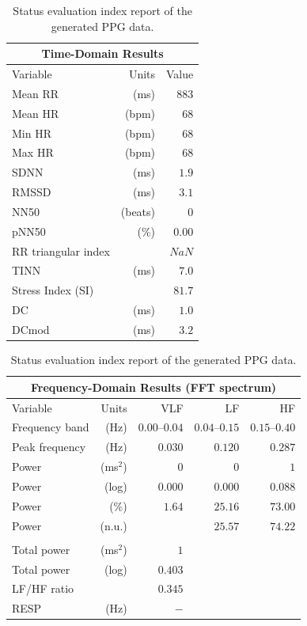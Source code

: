 \documentclass[sigchi,authordraft]{acmart}
\begin{document}
\begin{table}[!t]
  \small
  \centering
  \caption{Status evaluation index report of the generated PPG data.}
  \begin{tabular}{lrr}
  \multicolumn{3}{c}{Time-Domain Results} \\
  \toprule
    Variable & Units & Value \\
    \midrule
    Mean RR & (ms) & $883$ \\
    Mean HR & (bpm) & $68$ \\
    Min HR & (bpm) & $68$ \\
    Max HR & (bpm) & $68$ \\
    SDNN & (ms) & $1.9$ \\
    RMSSD & (ms) & $3.1$ \\
    NN50 & (beats) & $0$ \\
    pNN50 & (\%) & $0.00$ \\
    RR triangular index & & $NaN$ \\
    TINN & (ms) & $7.0$ \\
    Stress Index (SI) & & $81.7$ \\
    DC & (ms) & $1.0$ \\
    DCmod & (ms) & $3.2$ \\
    \bottomrule
  \end{tabular}
  \begin{tabular}{lrrrr}
  \multicolumn{5}{c}{Frequency-Domain Results (FFT spectrum)} \\
  \toprule
    Variable & Units & VLF & LF & HF \\
    \midrule
    Frequency band & (Hz) & $0.00\text{--}0.04$ & $0.04\text{--}0.15$ & $0.15\text{--}0.40$ \\
    Peak frequency & (Hz) & $0.030$ & $0.120$ & $0.287$ \\
    Power & (ms${}^\text{2}$) & $0$ & $0$ & $1$ \\
    Power & (log) & $0.000$ & $0.000$ & $0.088$ \\
    Power & (\%) & $1.64$ & $25.16$ & $73.00$ \\
    Power & (n.u.) & & $25.57$ & $74.22$ \\
    \text{-}\text{-}\text{-}\text{-}\text{-}\text{-}\text{-}\text{-}\text{-}\text{-}\text{-}\text{-}\text{-} & & & & \\
    Total power & (ms${}^\text{2}$) & $1$ & & \\
    Total power & (log) & $0.403$ & & \\
    LF/HF ratio & & $0.345$ & & \\
    RESP & (Hz) & $-$ & & \\
    \bottomrule
  \end{tabular}
  \label{tab:report_generated}
\end{table}
\end{document}
